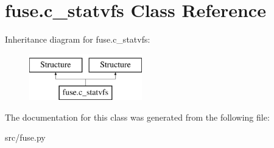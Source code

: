 \hypertarget{classfuse_1_1c__statvfs}{\section{fuse.\-c\-\_\-statvfs Class Reference}
\label{classfuse_1_1c__statvfs}
}
Inheritance diagram for fuse.\-c\-\_\-statvfs\-:\begin{figure}[H]
\begin{center}
\leavevmode
\includegraphics[height=2.000000cm]{classfuse_1_1c__statvfs}
\end{center}
\end{figure}


The documentation for this class was generated from the following file\-:\begin{DoxyCompactItemize}
\item 
src/fuse.\-py\end{DoxyCompactItemize}

